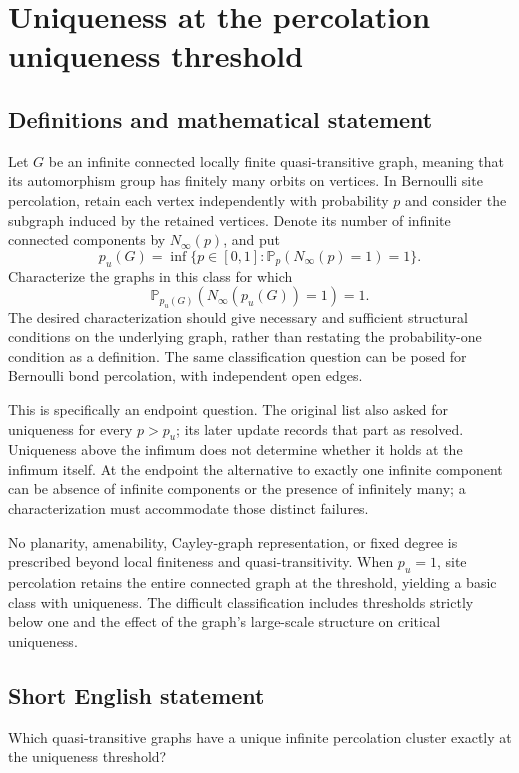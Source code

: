 \documentclass[11pt,a4paper]{article}
\begin{document}
\section*{Uniqueness at the percolation uniqueness threshold}\label{statement}

\subsection{Definitions and mathematical statement}
Let $G$ be an infinite connected locally finite quasi-transitive graph, meaning that its automorphism group has finitely many orbits on vertices. In Bernoulli site percolation, retain each vertex independently with probability $p$ and consider the subgraph induced by the retained vertices. Denote its number of infinite connected components by $N_\infty(p)$, and put
\[
p_u(G)=\inf\{p\in[0,1]:\mathbb P_p(N_\infty(p)=1)=1\}.
\]
Characterize the graphs in this class for which
\[
\mathbb P_{p_u(G)}(N_\infty(p_u(G))=1)=1.
\]
The desired characterization should give necessary and sufficient structural conditions on the underlying graph, rather than restating the probability-one condition as a definition. The same classification question can be posed for Bernoulli bond percolation, with independent open edges.

This is specifically an endpoint question. The original list also asked for uniqueness for every $p>p_u$; its later update records that part as resolved. Uniqueness above the infimum does not determine whether it holds at the infimum itself. At the endpoint the alternative to exactly one infinite component can be absence of infinite components or the presence of infinitely many; a characterization must accommodate those distinct failures.

No planarity, amenability, Cayley-graph representation, or fixed degree is prescribed beyond local finiteness and quasi-transitivity. When $p_u=1$, site percolation retains the entire connected graph at the threshold, yielding a basic class with uniqueness. The difficult classification includes thresholds strictly below one and the effect of the graph's large-scale structure on critical uniqueness.
\subsection{Short English statement}
Which quasi-transitive graphs have a unique infinite percolation cluster exactly at the uniqueness threshold?
\end{document}
